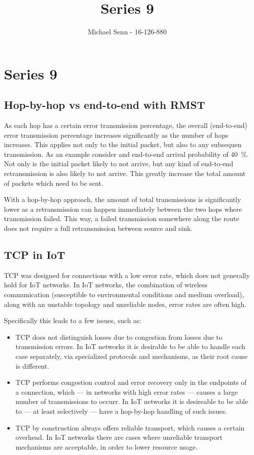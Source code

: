 \documentclass[a4paper]{scrreprt}
\title{Series 9}
\author{Michael Senn \maillink{michael.senn@students.unibe.ch} - 16-126-880}
\date{\printdate}
\begin{document}
\maketitle


\setcounter{chapter}{8}

\chapter{Series 9}

\section{Hop-by-hop vs end-to-end with RMST}

As each hop has a certain error transmission percentage, the overall
(end-to-end) error transmission percentage increases significantly as the
number of hops increases. This applies not only to the initial packet, but also
to any subsequen transmission. As an example consider and end-to-end arrival
probability of \SI{40}{\percent}. Not only is the initial packet likely to not
arrive, but any kind of end-to-end retransmission is also likely to not arrive.
This greatly increase the total amount of packets which need to be sent.

With a hop-by-hop approach, the amount of total transmissions is significantly
lower as a retransmission can happen immediately between the two hops where
transmission failed. This way, a failed transmission somewhere along the route
does not require a full retransmission between source and sink.

\section{TCP in IoT}

TCP was designed for connections with a low error rate, which does not
generally hold for IoT networks. In IoT networks, the combination of wireless
communication (susceptible to environmental conditions and medium overload),
along with an unstable topology and unreliable nodes, error rates are often
high.

Specifically this leads to a few issues, such as:
\begin{itemize}
		\item TCP does not distinguish losses due to congestion from losses due
				to transmission errors. In IoT networks it is desirable to be
				able to handle each case separately, via specialized protocols
				and mechanisms, as their root cause is different.
		\item TCP performs congestion control and error recovery only in the
				endpoints of a connection, which --- in networks with high
				error rates --- causes a large number of transmissions to
				occurr. In IoT networks it is desireable to be able to --- at
				least selectively --- have a hop-by-hop handling of such
				issues.
		\item TCP by construction always offers reliable transport, which
				causes a certain overhead. In IoT networks there are cases
				where unreliable transport mechanisms are acceptable, in order
				to lower resource usage.
\end{itemize}
\end{document}

